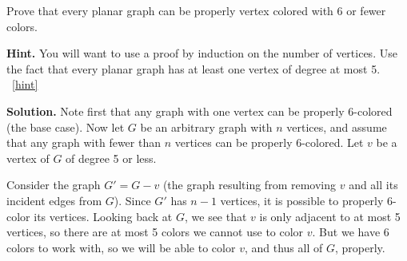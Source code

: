 \documentclass{book}
\begin{document}
\setcounter{project}{38}
\addtocounter{project}{-1}
\begin{activity}[]\label{activity-31}
\hypertarget{p-369}{}%
Prove that every planar graph can be properly vertex colored with 6 or fewer colors.%
\par\smallskip%
\noindent\textbf{Hint.}\hypertarget{hint-11}{}\quad%
\hypertarget{p-370}{}%
You will want to use a proof by induction on the number of vertices.  Use the fact that every planar graph has at least one vertex of degree at most 5.%
~\hfill{\tiny\hyperlink{a-38}{[hint]}\hypertarget{q-38}{}}\par\smallskip%
\noindent\textbf{Solution.}\hypertarget{solution-37}{}\quad%
\hypertarget{p-371}{}%
Note first that any graph with one vertex can be properly 6-colored (the base case).  Now let \(G\) be an arbitrary graph with \(n\) vertices, and assume that any graph with fewer than \(n\) vertices can be properly 6-colored.  Let \(v\) be a vertex of \(G\) of degree 5 or less.%
\par
\hypertarget{p-372}{}%
Consider the graph \(G' = G - v\) (the graph resulting from removing \(v\) and all its incident edges from \(G\)).  Since \(G'\) has \(n-1\) vertices, it is possible to properly 6-color its vertices.  Looking back at \(G\), we see that \(v\) is only adjacent to at most 5 vertices, so there are at most 5 colors we cannot use to color \(v\).  But we have 6 colors to work with, so we will be able to color \(v\), and thus all of \(G\), properly.%
\end{activity}
\end{document}
